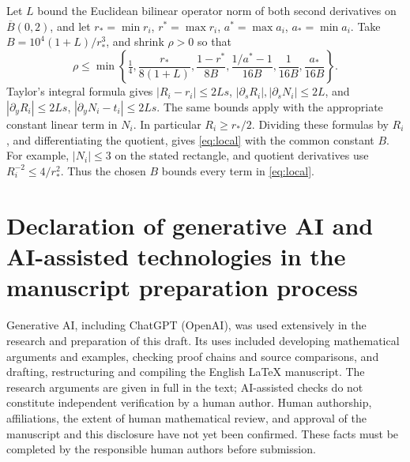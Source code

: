 \documentclass[11pt]{amsart}
\theoremstyle{definition}
\theoremstyle{remark}
\numberwithin{equation}{section}
\begin{document}
Let
\(L\) bound the Euclidean bilinear operator norm of both second
derivatives on \(\overline B(0,2)\), and let
\(r_*=\min r_i\), \(r^*=\max r_i\), \(a^*=\max a_i\),
\(a_*=\min a_i\). Take
\(B=10^4(1+L)/r_*^3\), and shrink \(\rho>0\) so that
\begin{equation}
\rho\le\min\left\{\tfrac14,\frac{r_*}{8(1+L)},
  \frac{1-r^*}{8B},\frac{1/a^*-1}{16B},
  \frac1{16B},\frac{a_*}{16B}\right\}.                        \label{eq:rho}
\end{equation}
Taylor's integral formula gives \(|R_i-r_i|\le2Ls\),
\(|\partial_sR_i|,|\partial_sN_i|\le2L\), and
\(|\partial_yR_i|\le2Ls\),
\(|\partial_yN_i-t_i|\le2Ls\).
The same bounds apply with the appropriate constant linear term in
\(N_i\). In particular \(R_i\ge r_*/2\).
Dividing these formulas by \(R_i\), and differentiating the quotient,
gives \eqref{eq:local} with the common constant $B$.
For example, \(|N_i|\le3\) on the stated rectangle, and
quotient derivatives use \(R_i^{-2}\le4/r_*^2\). Thus the chosen
\(B\) bounds every term in \eqref{eq:local}.


\section*{Declaration of generative AI and AI-assisted technologies
in the manuscript preparation process}
Generative AI, including ChatGPT (OpenAI), was used extensively
in the research and preparation of this draft. Its uses included
developing mathematical arguments and examples, checking proof
chains and source comparisons, and drafting, restructuring and
compiling the English LaTeX manuscript. The research arguments are
given in full in the text; AI-assisted checks do not constitute
independent verification by a human author. Human authorship,
affiliations, the extent of human mathematical review, and approval
of the manuscript and this disclosure have not yet been confirmed.
These facts must be completed by the responsible human authors
before submission.
\end{document}
